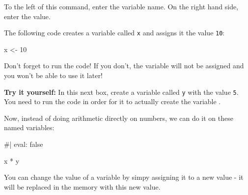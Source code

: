 \documentclass[
  letterpaper,
  DIV=11,
  numbers=noendperiod]{scrreprt}
\newenvironment{Shaded}{\begin{snugshade}}{\end{snugshade}}
\newcommand{\NormalTok}[1]{\textcolor[rgb]{0.00,0.23,0.31}{#1}}
\begin{document}
To the left of this command, enter the variable name. On the right hand
side, enter the value.

The following code creates a variable called \texttt{x} and assigns it
the value \texttt{10}:

\begin{Shaded}
\begin{Highlighting}[]

\NormalTok{x \textless{}{-} 10}
\end{Highlighting}
\end{Shaded}

\begin{tcolorbox}[enhanced jigsaw, coltitle=black, bottomrule=.15mm, title=\textcolor{quarto-callout-warning-color}{\faExclamationTriangle}\hspace{0.5em}{Warning}, leftrule=.75mm, colframe=quarto-callout-warning-color-frame, breakable, toprule=.15mm, opacityback=0, bottomtitle=1mm, toptitle=1mm, colback=white, rightrule=.15mm, titlerule=0mm, left=2mm, arc=.35mm, opacitybacktitle=0.6, colbacktitle=quarto-callout-warning-color!10!white]

Don't forget to run the code! If you don't, the variable will not be
assigned and you won't be able to use it later!

\end{tcolorbox}

\textbf{Try it yourself:} In this next box, create a variable called
\texttt{y} with the value \texttt{5}. You need to run the code in order
for it to actually create the variable .

\begin{Shaded}
\begin{Highlighting}[]

\end{Highlighting}
\end{Shaded}

Now, instead of doing arithmetic directly on numbers, we can do it on
these named variables:

\begin{Shaded}
\begin{Highlighting}[]
\NormalTok{\#| eval: false}

\NormalTok{x * y}
\end{Highlighting}
\end{Shaded}

You can change the value of a variable by simpy assigning it to a new
value - it will be replaced in the memory with this new value.
\end{document}
